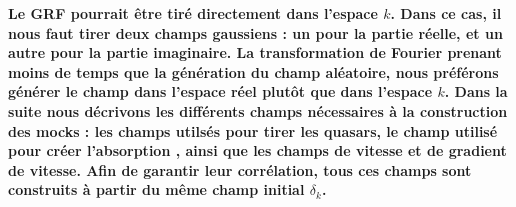 \documentclass[11pt, twoside, a4paper, openright]{report}
\begin{document}
\textbf{Le GRF pourrait être tiré directement dans l'espace $k$. Dans ce cas, il nous faut tirer deux champs gaussiens : un pour la partie réelle, et un autre pour la partie imaginaire. La transformation de Fourier prenant moins de temps que la génération du champ aléatoire, nous préférons générer le champ dans l'espace réel plutôt que dans l'espace $k$.
Dans la suite nous décrivons les différents champs nécessaires à la construction des mocks : les champs utilsés pour tirer les quasars, le champ utilisé pour créer l'absorption \lya{}, ainsi que les champs de vitesse et de gradient de vitesse. Afin de garantir leur corrélation, tous ces champs sont construits à partir du même champ initial $\delta_k$.}
\end{document}
